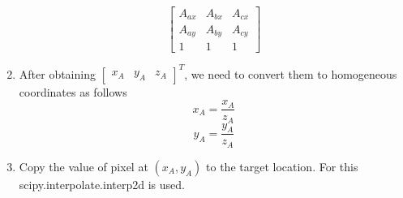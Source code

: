 \documentclass[conference]{IEEEtran}
\begin{document}
\begin{enumerate}
\begin{equation}
\begin{bmatrix}
A_{ax} & A_{bx} & A_{cx} \\
A_{ay} & A_{by} & A_{cy} \\
1 &1 &1
\end{bmatrix}
\end{equation}
\item After obtaining ${\begin{bmatrix}
x_A & y_A & z_A
\end{bmatrix}^T}$, we need to convert them to homogeneous coordinates as follows
\begin{equation}
x_A = \frac{x_A}{z_A}
\end{equation}  
\begin{equation}
y_A = \frac{y_A}{z_A}
\end{equation} 
\item Copy the value of pixel at $(x_A, y_A)$ to the target location. For this scipy.interpolate.interp2d is used.
\end{enumerate} 
\end{document}
